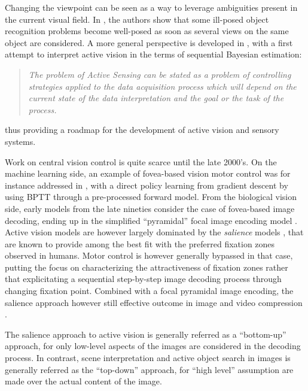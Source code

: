 \documentclass[12pt,twoside,openright]{article}
\begin{document}
Changing the viewpoint can be seen as a way to leverage ambiguities present in the current visual field. In \cite{aloimonos1988active}, the authors show that some ill-posed object recognition problems become well-posed as soon as several views on the  same object are considered. A more general perspective is developed in \cite{bajcsy1988active}, with a first attempt to interpret active vision in the terms of sequential Bayesian estimation:
\begin{quote}
	\emph{The problem  of Active Sensing can be stated as a problem of controlling strategies 
		applied to the data acquisition process which will depend on the current state 
		of the data interpretation and  the  goal  or the  task of  the  process.}
\end{quote}
thus providing a roadmap for the development of active vision and sensory systems.

Work on central vision control is quite scarce until the late 2000's.
On the machine learning side, an example of fovea-based vision motor control was for instance addressed in \cite{schmidhuber1991learning}, with a direct policy learning from gradient descent by using BPTT through a pre-processed forward model. 
From the biological vision side, early models from the late nineties  consider the case of fovea-based image decoding, ending up in the simplified ``pyramidal'' focal image encoding model \cite{kortum1996implementation}. Active vision models are however largely dominated by the \emph{salience} models \cite{itti2000saliency,itti2001computational,itti2005bayesian}, that are known to provide among the best fit with the preferred fixation zones observed in humans. 
Motor control is however generally bypassed in that case, putting the focus on characterizing the attractiveness of fixation zones rather that explicitating a sequential step-by-step image decoding process through changing fixation point.
Combined with a focal pyramidal image encoding, the salience approach however still effective outcome in image and video compression  \cite{wang2003foveation,guo2010novel}.


The salience approach to active vision is generally referred as a ``bottom-up'' approach, for only low-level aspects of the images are considered in the decoding process. In contrast, scene interpretation and active object search in images is generally referred as the ``top-down'' approach, for ``high level'' assumption are made over the actual content of the image. 
\end{document}
